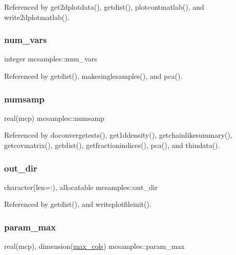 Referenced by get2dplotdata(), getdist(), plotcontmatlab(), and write2dplotmatlab().

\mbox{\label{namespacemcsamples_ad2594baa1bbb61af048a932e45cd4060}} 
\subsubsection{\texorpdfstring{num\+\_\+vars}{num\_vars}}
{\footnotesize\ttfamily integer mcsamples\+::num\+\_\+vars}



Referenced by getdist(), makesinglesamples(), and pca().

\mbox{\label{namespacemcsamples_a1c72401a481311c1c4b5b4d7c0b4b1d8}} 
\subsubsection{\texorpdfstring{numsamp}{numsamp}}
{\footnotesize\ttfamily real(mcp) mcsamples\+::numsamp}



Referenced by doconvergetests(), get1ddensity(), getchainlikesummary(), getcovmatrix(), getdist(), getfractionindices(), pca(), and thindata().

\mbox{\label{namespacemcsamples_a12247a941c9940691d984cd9596796bd}} 
\subsubsection{\texorpdfstring{out\+\_\+dir}{out\_dir}}
{\footnotesize\ttfamily character(len=\+:), allocatable mcsamples\+::out\+\_\+dir}



Referenced by getdist(), and writeplotfileinit().

\mbox{\label{namespacemcsamples_a85c3a30e0056c5dcec952621d4782012}} 
\subsubsection{\texorpdfstring{param\+\_\+max}{param\_max}}
{\footnotesize\ttfamily real(mcp), dimension(\mbox{\hyperlink{namespacemcsamples_ae8386bad918d8af8d203683c01d5818c}{max\+\_\+cols}}) mcsamples\+::param\+\_\+max}



